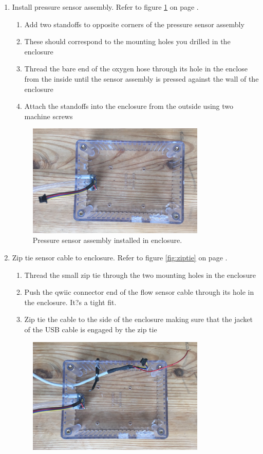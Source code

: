 \documentclass[11pt, letterpaper]{article}
\begin{document}
\begin{enumerate}
\begin{enumerate}[label=5.\arabic*]
\item
Install pressure sensor assembly. Refer to figure \ref{fig:bmeinbox} on page \pageref{fig:bmeinbox}.
\begin{enumerate}[label=5.2.\arabic*]
\item
Add two standoffs to opposite corners of the pressure sensor assembly
\item
These should correspond to the mounting holes you drilled in the enclosure
\item
Thread the bare end of the oxygen hose through its hole in the enclose from the inside until the sensor assembly is pressed against the wall of the  enclosure
\item
Attach the standoffs into the enclosure from the outside using two machine screws
\end{enumerate}
\begin{figure}[H]
\centering
\includegraphics[width=0.8\textwidth]{images/bmeinbox.JPG} 
\caption{Pressure sensor assembly installed in enclosure.} 
\label{fig:bmeinbox}
\end{figure}
\item
Zip tie sensor cable to enclosure. Refer to figure \ref{fig:ziptie} on page \pageref{fig:ziptie}.
\begin{enumerate}[label=5.3.\arabic*]
\item
Thread the small zip tie through the two mounting holes in the enclosure
\item
Push the qwiic connector end of the flow sensor cable through its hole in the enclosure. It?s a tight fit.
\item
Zip tie the cable to the side of the enclosure making sure that the jacket of the USB cable is engaged by the zip tie
\end{enumerate}
\begin{figure}[H]
\centering
\includegraphics[width=0.8\textwidth]{images/ziptie.JPG} 

\end{figure}
\end{enumerate}
\end{enumerate}
\end{document}
